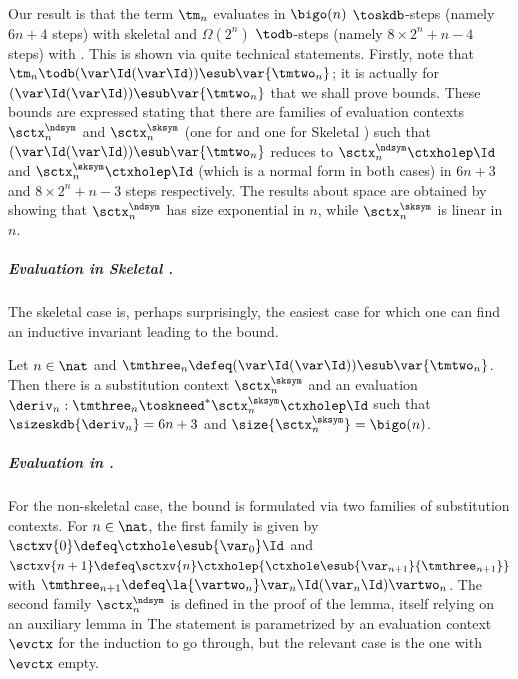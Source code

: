 Our result is that the term $\tm_n$ evaluates in $\bigo(n)$  $\toskdb$-steps (namely $6n + 4$ steps) with skeletal \cbneed and
$\Omega(2^n)$  $\todb$-steps (namely $8 \times 2^n + n -4$ steps) with \cbneed.
This is shown via quite technical statements. Firstly, note that $\tm_n \todb (\var\Id (\var\Id)) \esub\var{\tmtwo_n}$; it is actually for $(\var\Id (\var\Id)) \esub\var{\tmtwo_n}$ that we shall prove bounds. These bounds are expressed stating that there are families of evaluation contexts $\sctx_n^{\ndsym}$ and $\sctx_n^{\sksym}$ (one for \cbneed and one for Skeletal \cbneed) such that
$(\var\Id (\var\Id)) \esub\var{\tmtwo_n}$ reduces to
$\sctx_n^{\ndsym}\ctxholep\Id$  and $\sctx_n^{\sksym}\ctxholep\Id$ (which is a normal form in both cases) in $6n + 3$ and $8 \times 2^n + n - 3$ steps respectively. The results about space are obtained by showing that $\sctx_n^{\ndsym}$ has size exponential in $n$, while $\sctx_n^{\sksym}$ is linear in $n$.

\subparagraph{Evaluation in Skeletal \cbneed.} The skeletal case is, perhaps surprisingly, the easiest case for which one can find an inductive invariant leading to the bound.

\begin{toappendix}
\begin{lemma}
\label{l:skneed-family-aux}
  Let $n \in \nat$ and $\tmthree_n \defeq (\var\Id(\var\Id))\esub\var{\tmtwo_n}$. Then there is a substitution context $\sctx_n^{\sksym}$ and an evaluation 
  $\deriv_n: \tmthree_n \toskneed^* \sctx_n^{\sksym}\ctxholep\Id$ such that $\sizeskdb{\deriv_n}=6n + 3$ and $\size{\sctx_n^{\sksym}} = \bigo(n)$.
\end{lemma}
\end{toappendix}

\subparagraph{Evaluation in \cbneed.} For the non-skeletal case, the bound is formulated via two families of substitution contexts.
For $n \in \nat$, the first family is given by
$\sctxv{0} \defeq \ctxhole\esub{\var_0}\Id$ and
$\sctxv{n+1} \defeq
\sctxv{n}\ctxholep{\ctxhole\esub{\var_{n+1}}{\tmthree_{n+1}}}$
with $\tmthree_{n+1} \defeq \la{\vartwo_n}\var_n\Id(\var_n\Id)\vartwo_n$. The second family $\sctx^{\ndsym}_n$ is defined in the proof of the lemma, itself relying on an auxiliary lemma in
The statement is parametrized by an evaluation context $\evctx$ for the induction to go through, but the relevant case is the one with $\evctx$ empty.

